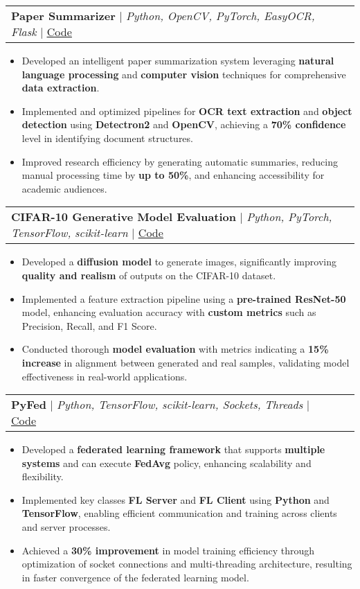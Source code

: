 \documentclass[letterpaper,11pt]{article}
\makeatletter
\newcommand{\resumeItem}[1]{
  \item\small{
    #1 \vspace{0pt}
  }
}
\newcommand{\resumeProjectHeading}[2]{
    \item
    \begin{tabular*}{0.97\textwidth}{l@{\extracolsep{\fill}}r}
      \small#1 & #2 \\
    \end{tabular*}\vspace{-3pt}
}
\newcommand{\resumeItemListStart}{\begin{itemize}}
\newcommand{\resumeItemListEnd}{\end{itemize}\vspace{-5pt}}
\makeatother
\begin{document}
\resumeProjectHeading
    {\textbf{Paper Summarizer} $|$ \emph{Python, OpenCV, PyTorch, EasyOCR, Flask} $|$ \href{https://github.com/amirrezaskh/paper-summarizer}{\underline{Code}}} {}
    \resumeItemListStart
        \resumeItem{Developed an intelligent paper summarization system leveraging \textbf{natural language processing} and \textbf{computer vision} techniques for comprehensive \textbf{data extraction}.}
        \resumeItem{Implemented and optimized pipelines for \textbf{OCR text extraction} and \textbf{object detection} using \textbf{Detectron2} and \textbf{OpenCV}, achieving a \textbf{70\% confidence} level in identifying document structures.}
        \resumeItem{Improved research efficiency by generating automatic summaries, reducing manual processing time by \textbf{up to 50\%}, and enhancing accessibility for academic audiences.}
    \resumeItemListEnd

\resumeProjectHeading
    {\textbf{CIFAR-10 Generative Model Evaluation} $|$ \emph{Python, PyTorch, TensorFlow, scikit-learn} $|$ \href{https://github.com/amirrezaskh/Unified-Image-Evaluation-Metric}{\underline{Code}}} {}
    \resumeItemListStart
        \resumeItem{Developed a \textbf{diffusion model} to generate images, significantly improving \textbf{quality and realism} of outputs on the CIFAR-10 dataset.}
        \resumeItem{Implemented a feature extraction pipeline using a \textbf{pre-trained ResNet-50} model, enhancing evaluation accuracy with \textbf{custom metrics} such as Precision, Recall, and F1 Score.}
        \resumeItem{Conducted thorough \textbf{model evaluation} with metrics indicating a \textbf{15\% increase} in alignment between generated and real samples, validating model effectiveness in real-world applications.}
    \resumeItemListEnd

\resumeProjectHeading
    {\textbf{PyFed} $|$ \emph{Python, TensorFlow, scikit-learn, Sockets, Threads} $|$ \href{https://github.com/amirrezaskh/PyFed}{\underline{Code}}} {}
    \resumeItemListStart
        \resumeItem{Developed a \textbf{federated learning framework} that supports \textbf{multiple systems} and can execute \textbf{FedAvg} policy, enhancing scalability and flexibility.}
        \resumeItem{Implemented key classes \textbf{FL Server} and \textbf{FL Client} using \textbf{Python} and \textbf{TensorFlow}, enabling efficient communication and training across clients and server processes.}
        \resumeItem{Achieved a \textbf{30\% improvement} in model training efficiency through optimization of socket connections and multi-threading architecture, resulting in faster convergence of the federated learning model.}
    \resumeItemListEnd
\end{document}
